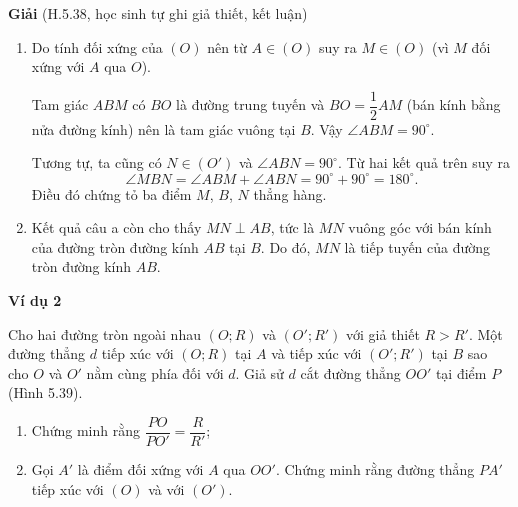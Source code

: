 \begin{exercises}
    \textbf{Giải} (H.5.38, học sinh tự ghi giả thiết, kết luận)

    \begin{enumerate}[label=\alph*)]
        \item Do tính đối xứng của $(O)$ nên từ $A\in (O)$ suy ra $M\in (O)$ (vì $M$ đối xứng với $A$ qua $O$).

        Tam giác $ABM$ có $BO$ là đường trung tuyến và $BO=\dfrac{1}{2}AM$ (bán kính bằng nửa đường kính) nên là tam giác vuông tại $B$. Vậy $\angle ABM=90^\circ$.

        Tương tự, ta cũng có $N\in (O')$ và $\angle ABN=90^\circ$. Từ hai kết quả trên suy ra
        \[
            \angle MBN=\angle ABM+\angle ABN=90^\circ+90^\circ=180^\circ.
        \]
        Điều đó chứng tỏ ba điểm $M$, $B$, $N$ thẳng hàng.

        \item Kết quả câu a còn cho thấy $MN\perp AB$, tức là $MN$ vuông góc với bán kính của đường tròn đường kính $AB$ tại $B$. Do đó, $MN$ là tiếp tuyến của đường tròn đường kính $AB$.
    \end{enumerate}

    \textbf{Ví dụ 2}

    Cho hai đường tròn ngoài nhau $(O; R)$ và $(O'; R')$ với giả thiết $R>R'$. Một đường thẳng $d$ tiếp xúc với $(O; R)$ tại $A$ và tiếp xúc với $(O'; R')$ tại $B$ sao cho $O$ và $O'$ nằm cùng phía đối với $d$. Giả sử $d$ cắt đường thẳng $OO'$ tại điểm $P$ (Hình 5.39).
    \begin{enumerate}[label=\alph*)]
        \item Chứng minh rằng $\dfrac{PO}{PO'}=\dfrac{R}{R'}$;
        \item Gọi $A'$ là điểm đối xứng với $A$ qua $OO'$. Chứng minh rằng đường thẳng $PA'$ tiếp xúc với $(O)$ và với $(O')$.
    \end{enumerate}

    \begin{center}
\end{center}
\end{exercises}

